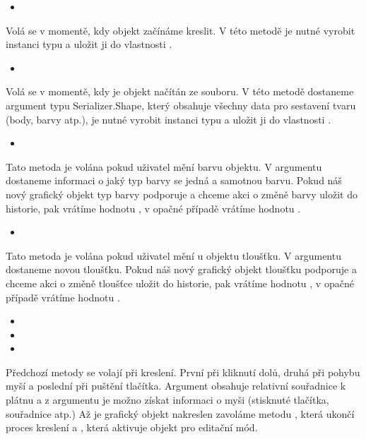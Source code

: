 \documentclass[
  field=inf,
  biblatex,
  glossaries,
  index
]{kidiplom}
\begin{document}
\begin{itemize}
\item {}
\end{itemize}
Volá se v momentě, kdy objekt začínáme kreslit. V této metodě je nutné vyrobit instanci typu  a uložit ji do vlastnosti .


\begin{itemize}
\item {}
\end{itemize}
Volá se v momentě, kdy je objekt načítán ze souboru. V této metodě dostaneme argument typu {Serializer.Shape}, který obsahuje všechny data pro sestavení tvaru (body, barvy atp.), je nutné vyrobit instanci typu  a uložit ji do vlastnosti .


\begin{itemize}
\item {}
\end{itemize}
Tato metoda je volána pokud uživatel mění barvu objektu. V argumentu dostaneme informaci o jaký typ barvy se jedná a samotnou barvu. Pokud náš nový grafický objekt typ barvy podporuje a chceme akci o změně barvy uložit do historie, pak vrátíme hodnotu , v opačné případě vrátíme hodnotu .

\begin{itemize}
\item {}
\end{itemize}
Tato metoda je volána pokud uživatel mění u objektu tloušťku. V argumentu dostaneme novou tloušťku. Pokud náš nový grafický objekt tloušťku podporuje a chceme akci o změně tloušťce uložit do historie, pak vrátíme hodnotu , v opačné případě vrátíme hodnotu .

\begin{itemize}
\item {}
\item {}
\item {}
\end{itemize}
Předchozí metody se volají při kreslení. První při kliknutí dolů, druhá při pohybu myší a poslední při puštění tlačítka. Argument  obsahuje relativní souřadnice k plátnu a z argumentu  je možno získat informaci o myši (stisknuté tlačítka, souřadnice atp.) Až je grafický objekt nakreslen zavoláme metodu , která ukončí proces kreslení a , která aktivuje objekt pro editační mód.
\end{document}
